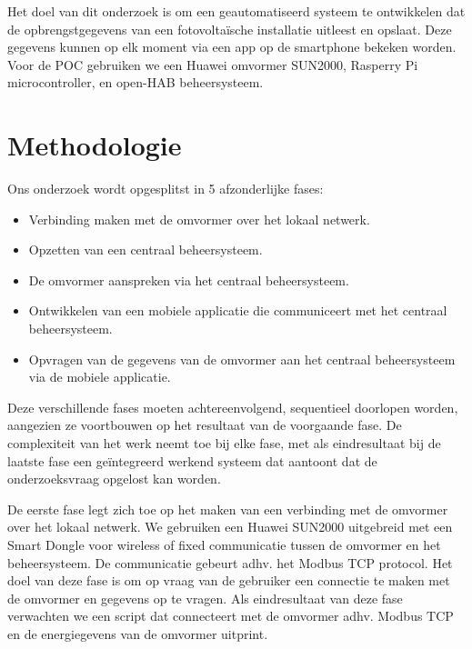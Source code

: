 \documentclass{hogent-article}
\begin{document}
    Het doel van dit onderzoek is om een geautomatiseerd systeem te ontwikkelen dat de opbrengstgegevens van een fotovoltaïsche installatie uitleest en opslaat. Deze gegevens kunnen op elk moment via een app op de smartphone bekeken worden. Voor de POC gebruiken we een Huawei omvormer SUN2000, Rasperry Pi microcontroller, en open-HAB beheersysteem.
    
    \section{Methodologie}
    
    
    Ons onderzoek wordt opgesplitst in 5 afzonderlijke fases:
    \begin{itemize}
        \item Verbinding maken met de omvormer over het lokaal netwerk.
        \item Opzetten van een centraal beheersysteem.
        \item De omvormer aanspreken via het centraal beheersysteem.
        \item Ontwikkelen van een mobiele applicatie die communiceert met het centraal beheersysteem.
        \item Opvragen van de gegevens van de omvormer aan het centraal beheersysteem via de mobiele applicatie.
    \end{itemize}
    Deze verschillende fases moeten achtereenvolgend, sequentieel doorlopen worden, aangezien ze voortbouwen op het resultaat van de voorgaande fase. De complexiteit van het werk neemt toe bij elke fase, met als eindresultaat bij de laatste fase een geïntegreerd werkend systeem dat aantoont dat de onderzoeksvraag opgelost kan worden.
    
    De eerste fase legt zich toe op het maken van een verbinding met de omvormer over het lokaal netwerk. We gebruiken een Huawei SUN2000 uitgebreid met een Smart Dongle voor wireless of fixed communicatie tussen de omvormer en het beheersysteem. De communicatie gebeurt adhv. het Modbus TCP protocol. Het doel van deze fase is om op vraag van de gebruiker een connectie te maken met de omvormer en gegevens op te vragen. Als eindresultaat van deze fase verwachten we een script dat connecteert met de omvormer adhv. Modbus TCP en de energiegevens van de omvormer uitprint.
    
\end{document}
